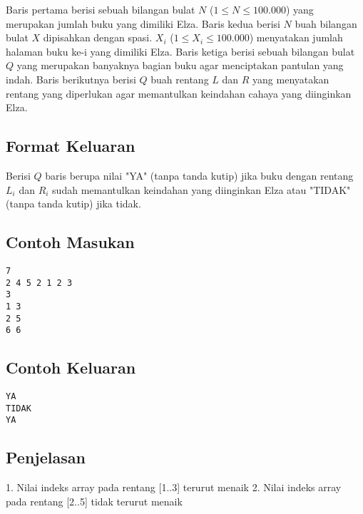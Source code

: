 \documentclass{article}
\begin{document}
Baris pertama berisi sebuah bilangan bulat $N$ ($1 \leq N \leq 100.000$) yang merupakan jumlah buku yang dimiliki Elza.
Baris kedua berisi $N$ buah bilangan bulat $X$ dipisahkan dengan spasi. $X_i$ ($1 \leq X_i \leq 100.000$) menyatakan jumlah halaman buku ke-i yang dimiliki Elza.
Baris ketiga berisi sebuah bilangan bulat $Q$ yang merupakan banyaknya bagian buku agar menciptakan pantulan yang indah.
Baris berikutnya berisi $Q$ buah rentang $L$ dan $R$ yang menyatakan rentang yang diperlukan agar memantulkan keindahan cahaya yang diinginkan Elza.

\subsection*{Format Keluaran}

Berisi $Q$ baris berupa nilai "YA" (tanpa tanda kutip) 
jika buku dengan rentang $L_i$ dan $R_i$ sudah memantulkan keindahan yang diinginkan Elza 
atau "TIDAK" (tanpa tanda kutip) jika tidak.
\\

\begin{multicols}{2}
\subsection*{Contoh Masukan}
\begin{lstlisting}
7
2 4 5 2 1 2 3
3
1 3
2 5
6 6
\end{lstlisting}
\columnbreak
\subsection*{Contoh Keluaran}
\begin{lstlisting}
YA
TIDAK
YA
\end{lstlisting}
\vfill
\null
\end{multicols}

\subsection*{Penjelasan}
1. Nilai indeks array pada rentang [1..3] terurut menaik
2. Nilai indeks array pada rentang [2..5] tidak terurut menaik

\pagebreak
\end{document}
